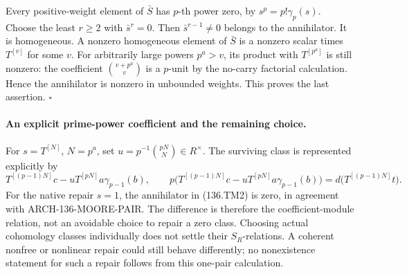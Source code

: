 Every positive-weight element of \(\bar S\) has \(p\)-th
power zero, by \(s^p=p!\gamma_p(s)\). Choose the least
\(r\geq2\) with \(\bar s^{r}=0\). Then
\(\bar s^{r-1}\neq0\) belongs to the annihilator.
It is homogeneous. A nonzero homogeneous element of \(\bar S\)
is a nonzero scalar times \(T^{[v]}\) for some \(v\).
For arbitrarily large powers \(p^a>v\), its product with
\(T^{[p^a]}\) is still nonzero: the coefficient
\(\binom{v+p^a}{v}\) is a \(p\)-unit by the no-carry
factorial calculation. Hence the annihilator is nonzero in
unbounded weights. This proves the last assertion.
\(\square\)

\paragraph{An explicit prime-power coefficient and the remaining choice.}
For \(s=T^{[N]}\), \(N=p^a\), set
\(u=p^{-1}\binom{pN}{N}\in R^\times\). The surviving class is
represented explicitly by
\[
 T^{[(p-1)N]}c-uT^{[pN]}a\gamma_{p-1}(b),
 \qquad
 p\bigl(T^{[(p-1)N]}c-uT^{[pN]}a\gamma_{p-1}(b)\bigr)
       =d\bigl(T^{[(p-1)N]}t\bigr).
 \tag{136.TM4}
\]
For the native repair \(s=1\), the annihilator in (136.TM2)
is zero, in agreement with ARCH-136-MOORE-PAIR. The difference
is therefore the coefficient-module relation, not an avoidable
choice to repair a zero class. Choosing actual cohomology classes
individually does not settle their \(S_R\)-relations. A coherent
nonfree or nonlinear repair could still behave differently;
no nonexistence statement for such a repair follows from this
one-pair calculation.
